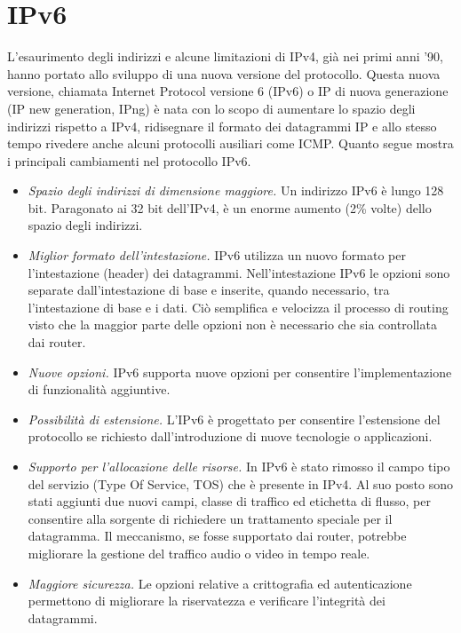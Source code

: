 \section{IPv6}
L'esaurimento degli indirizzi e alcune limitazioni di IPv4, già nei primi anni '90, hanno portato allo sviluppo di una nuova versione del protocollo. Questa nuova versione, chiamata Internet Protocol versione 6 (IPv6) o IP di nuova generazione (IP new generation, IPng) è nata con lo scopo di aumentare lo spazio degli indirizzi rispetto a IPv4, ridisegnare il formato dei datagrammi IP e allo stesso tempo rivedere anche alcuni protocolli ausiliari come ICMP. Quanto segue mostra i principali cambiamenti nel protocollo IPv6.
\begin{itemize}
    \item \textit{Spazio degli indirizzi di dimensione maggiore.} Un indirizzo IPv6 è lungo 128 bit. Paragonato ai 32 bit dell'IPv4, è un enorme aumento (2\% volte) dello spazio degli indirizzi.
    \item \textit{Miglior formato dell'intestazione.} IPv6 utilizza un nuovo formato per l'intestazione (header) dei datagrammi. Nell'intestazione IPv6 le opzioni sono separate dall'intestazione di base e inserite, quando necessario, tra l'intestazione di base e i dati. Ciò semplifica e velocizza il processo di routing visto che la maggior parte delle opzioni non è necessario che sia controllata dai router.
    \item \textit{Nuove opzioni.} IPv6 supporta nuove opzioni per consentire l'implementazione di funzionalità aggiuntive.
    \item \textit{Possibilità di estensione.} L'IPv6 è progettato per consentire l'estensione del protocollo se richiesto dall'introduzione di nuove tecnologie o applicazioni.
    \item \textit{Supporto per l'allocazione delle risorse.} In IPv6 è stato rimosso il campo tipo del servizio (Type Of Service, TOS) che è presente in IPv4. Al suo posto sono stati aggiunti due nuovi campi, classe di traffico ed etichetta di flusso, per consentire alla sorgente di richiedere un trattamento speciale per il datagramma. Il meccanismo, se fosse supportato dai router, potrebbe migliorare la gestione del traffico audio o video in tempo reale.
    \item \textit{Maggiore sicurezza.} Le opzioni relative a crittografia ed autenticazione permettono di migliorare la riservatezza e verificare l'integrità dei datagrammi.
\end{itemize}

